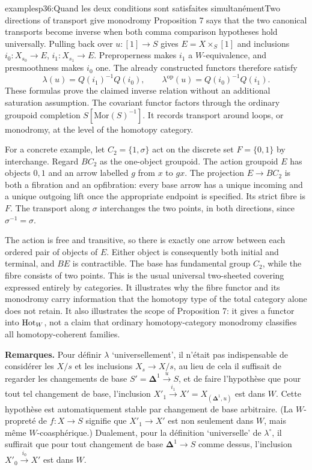 \begin{dcomment}{examples}{p36:Quand les deux conditions sont satisfaites simultanément}{Two directions of transport give monodromy}
Proposition 7 says that the two canonical transports become inverse when both comma comparison hypotheses hold universally. Pulling back over $u:[1]\to S$ gives $E=X\times_S[1]$ and inclusions $i_0:X_{s_0}\to E$, $i_1:X_{s_1}\to E$. Preproperness makes $i_1$ a $W$-equivalence, and presmoothness makes $i_0$ one. The already constructed functors therefore satisfy
\[
 \lambda(u)=Q(i_1)^{-1}Q(i_0),\qquad
 \lambda^{\mathrm{op}}(u)=Q(i_0)^{-1}Q(i_1).
\]
These formulas prove the claimed inverse relation without an additional saturation assumption. The covariant functor factors through the ordinary groupoid completion $S[\mathrm{Mor}(S)^{-1}]$. It records transport around loops, or monodromy, at the level of the homotopy category.

For a concrete example, let $C_2=\{1,\sigma\}$ act on the discrete set $F=\{0,1\}$ by interchange. Regard $BC_2$ as the one-object groupoid. The action groupoid $E$ has objects $0,1$ and an arrow labelled $g$ from $x$ to $gx$. The projection $E\to BC_2$ is both a fibration and an opfibration: every base arrow has a unique incoming and a unique outgoing lift once the appropriate endpoint is specified. Its strict fibre is $F$. The transport along $\sigma$ interchanges the two points, in both directions, since $\sigma^{-1}=\sigma$.

The action is free and transitive, so there is exactly one arrow between each ordered pair of objects of $E$. Either object is consequently both initial and terminal, and $BE$ is contractible. The base has fundamental group $C_2$, while the fibre consists of two points. This is the usual universal two-sheeted covering expressed entirely by categories. It illustrates why the fibre functor and its monodromy carry information that the homotopy type of the total category alone does not retain. It also illustrates the scope of Proposition 7: it gives a functor into $\mathrm{Hot}_W$, not a claim that ordinary homotopy-category monodromy classifies all homotopy-coherent families.
\end{dcomment}


\textbf{Remarques.} Pour définir $\lambda$ `universellement', il n'était pas indispensable de considérer les $X/s$ et les inclusions $X_s\longrightarrow X/s$, au lieu de cela il suffisait de regarder les changements de base $S'=\mathbf{\Delta}^1\xrightarrow{u}S$, et de faire l'hypothèse que pour tout tel changement de base, l'inclusion $X'_1\xrightarrow{i_1}X'=X_{(\mathbf{\Delta}^1,u)}$ est dans $W$. Cette hypothèse est automatiquement stable par changement de base arbitraire. (La $W$-propreté de $f : X\longrightarrow S$ signifie que $X'_1\longrightarrow X'$ est non seulement dans $W$, mais même $W$-coasphérique.) Dualement, pour la définition `universelle' de $\lambda^\circ$, il suffirait que pour tout changement de base $\mathbf{\Delta}^1\longrightarrow S$ comme dessus, l'inclusion $X'_0\xrightarrow{i_0}X'$ est dans $W$.

